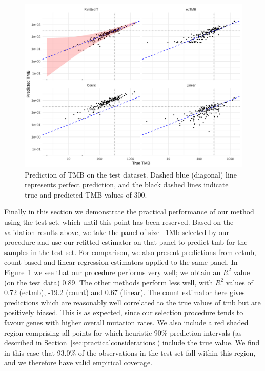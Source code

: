 \documentclass[12pt]{article}
\begin{document}
\begin{figure}[htbp]
\centering
\includegraphics[width=6in]{fig8.png}
\vspace*{-5mm}
\caption{Prediction of TMB on the test dataset. Dashed blue (diagonal) line represents perfect prediction, and the black dashed lines indicate true and predicted TMB values of 300. %
\label{fig:OneMBPredictions}}
\vspace*{-2mm}
\end{figure} 

Finally in this section we demonstrate the practical performance of our method using the test set, which until this point has been reserved. Based on the validation results above, we take the panel of size ~1Mb selected by our procedure and use our refitted estimator on that panel to predict \acrshort{tmb} for the samples in the test set. For comparison, we also present predictions from \acrshort{ectmb}, count-based and linear regression estimators applied to the same panel. In Figure~\ref{fig:OneMBPredictions} we see that our procedure performs very well; we obtain an $R^2$ value (on the test data) 0.89.  The other methods perform less well, with $R^2$ values of 0.72 (\acrshort{ectmb}), -19.2 (count) and 0.67 (linear). The count estimator here gives predictions which are reasonably well correlated to the true values of \acrshort{tmb} but are positively biased. This is as expected, since our selection procedure tends to favour genes with higher overall mutation rates. 
We also include a red shaded region comprising all points for which heuristic 90\% prediction intervals (as described in Section~\ref{sec:practicalconsiderations}) include the true value. We find in this case that 93.0\% of the observations in the test set fall within this region, and we therefore have valid empirical coverage.
\end{document}
